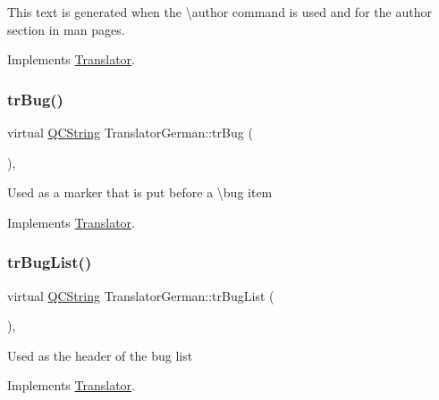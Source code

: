 This text is generated when the \textbackslash{}author command is used and for the author section in man pages. 

Implements \mbox{\hyperlink{class_translator}{Translator}}.

\mbox{\label{class_translator_german_a267e8d5856041c0e81262ca2d85d6b82}} 
\subsubsection{\texorpdfstring{trBug()}{trBug()}}
{\footnotesize\ttfamily virtual \mbox{\hyperlink{class_q_c_string}{Q\+C\+String}} Translator\+German\+::tr\+Bug (\begin{DoxyParamCaption}{ }\end{DoxyParamCaption})\hspace{0.3cm}{\ttfamily [inline]}, {\ttfamily [virtual]}}

Used as a marker that is put before a \textbackslash{}bug item 

Implements \mbox{\hyperlink{class_translator}{Translator}}.

\mbox{\label{class_translator_german_a8ebf727ce0929525024d61e8604fe6e6}} 
\subsubsection{\texorpdfstring{trBugList()}{trBugList()}}
{\footnotesize\ttfamily virtual \mbox{\hyperlink{class_q_c_string}{Q\+C\+String}} Translator\+German\+::tr\+Bug\+List (\begin{DoxyParamCaption}{ }\end{DoxyParamCaption})\hspace{0.3cm}{\ttfamily [inline]}, {\ttfamily [virtual]}}

Used as the header of the bug list 

Implements \mbox{\hyperlink{class_translator}{Translator}}.

\mbox{\label{class_translator_german_a67e49f4354c664aa49f700c02db17838}} 
